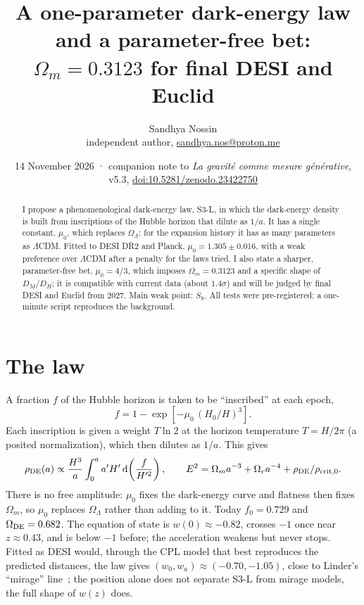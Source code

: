 \documentclass[10pt,a4paper]{article}
\title{\vspace{-1.2cm}\textbf{A one-parameter dark-energy law and a parameter-free bet:\\ $\Omega_m = 0.3123$ for final DESI and Euclid}}
\author{Sandhya Nossin\\\small independent author, \href{mailto:sandhya.nos@proton.me}{sandhya.nos@proton.me}}
\date{\small 14 November 2026 · companion note to \emph{La gravité comme mesure générative}, v5.3, \href{https://doi.org/10.5281/zenodo.23422750}{doi:10.5281/zenodo.23422750}}
\begin{document}
\maketitle
\vspace{-0.6cm}

\begin{abstract}
\noindent I propose a phenomenological dark-energy law, S3-L, in which the dark-energy density is built from inscriptions of the Hubble horizon that dilute as $1/a$. It has a single constant, $\mu_0$, which replaces $\Omega_\Lambda$: for the expansion history it has as many parameters as $\Lambda$CDM. Fitted to DESI DR2 and Planck, $\mu_0 = 1.305 \pm 0.016$, with a weak preference over $\Lambda$CDM after a penalty for the laws tried. I also state a sharper, parameter-free bet, $\mu_0 = 4/3$, which imposes $\Omega_m = 0.3123$ and a specific shape of $D_M/D_H$; it is compatible with current data (about $1.4\sigma$) and will be judged by final DESI and Euclid from 2027. Main weak point: $S_8$. All tests were pre-registered; a one-minute script reproduces the background.
\end{abstract}

\noindent{}

\section{The law}
A fraction $f$ of the Hubble horizon is taken to be ``inscribed'' at each epoch,
\begin{equation}\label{eq:f}
  f = 1 - \exp\!\left[-\mu_0\,(H_0/H)^3\right].
\end{equation}
Each inscription is given a weight $T\ln 2$ at the horizon temperature $T = H/2\pi$ (a posited normalization), which then dilutes as $1/a$. This gives
\begin{equation}\label{eq:rho}
  \rho_{\rm DE}(a) \propto \frac{H^3}{a}\int_0^{a} a'H'\,\mathrm{d}\!\left(\frac{f}{H'^2}\right), \qquad
  E^2 = \Omega_m a^{-3} + \Omega_r a^{-4} + \rho_{\rm DE}/\rho_{\rm crit,0}.
\end{equation}
There is no free amplitude: $\mu_0$ fixes the dark-energy curve and flatness then fixes $\Omega_m$, so $\mu_0$ replaces $\Omega_\Lambda$ rather than adding to it. Today $f_0 = 0.729$ and $\Omega_{\rm DE} = 0.682$. The equation of state is $w(0) \approx -0.82$, crosses $-1$ once near $z \approx 0.43$, and is below $-1$ before; the acceleration weakens but never stops. Fitted as DESI would, through the CPL model that best reproduces the predicted distances, the law gives $(w_0, w_a) \approx (-0.70, -1.05)$, close to Linder's ``mirage'' line~\cite{linder07}; the position alone does not separate S3-L from mirage models, the full shape of $w(z)$ does.
\end{document}
